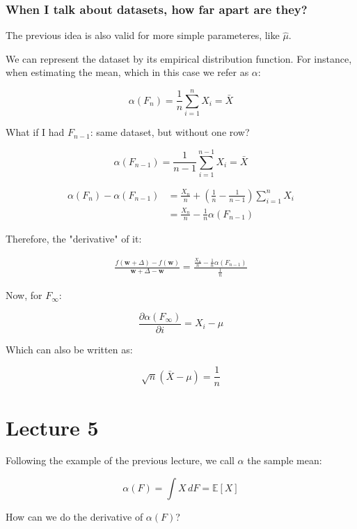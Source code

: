\documentclass{article}
\begin{document}
\subsubsection{When I talk about datasets, how far apart are they?}

The previous idea is also valid for more simple parameteres, like $\hat{\mu}$.

We can represent the dataset by its empirical distribution function. For instance, when estimating the mean, which in this case we refer as $\alpha$:

$$
\alpha(F_n) = \frac{1}{n} \sum_{i=1}^{n} X_i = \bar{X}
$$

What if I had $F_{n-1}$: same dataset, but without one row?


$$
\alpha(F_{n-1}) = \frac{1}{n-1} \sum_{i=1}^{n-1} X_i = \bar{X}
$$

\begin{align*}
    \alpha(F_n) - \alpha(F_{n-1}) &= \frac{X_n}{n} + \left(\frac{1}{n} - \frac{1}{n-1}\right) \sum_{i = 1}^n X_i \\
    &= \frac{X_n}{n} - \frac{1}{n} \alpha(F_{n-1})
\end{align*}

Therefore, the "derivative" of it:

\begin{align*}
    \frac{f(\textbf{w}+\Delta) - f(\textbf{w})}{\textbf{w}+\Delta-\textbf{w}} = \frac{\frac{X_n}{n} - \frac{1}{n} \alpha(F_{n-1})}{\frac{1}{n}}
\end{align*}

Now, for $F_{\infty}$:

$$
\frac{\partial \alpha(F_{\infty})}{\partial i} = X_i - \mu
$$

Which can also be written as:

$$
\sqrt{n}(\bar{X} - \mu) = \frac{1}{n}
$$

\section{Lecture 5}
Following the example of the previous lecture, we call $\alpha$ the sample mean:

$$
\alpha(F) = \int X \,dF = \mathbb{E}[X]
$$

How can we do the derivative of $\alpha(F)$?
\end{document}
